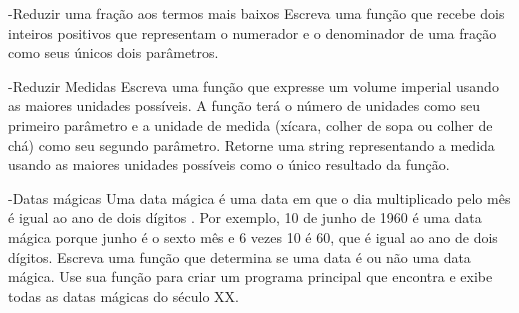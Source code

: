 -Reduzir uma fração aos termos mais baixos Escreva uma função que recebe dois inteiros positivos que representam o numerador e o denominador de uma fração como seus únicos dois parâmetros. 

-Reduzir Medidas Escreva uma função que expresse um volume imperial usando as maiores unidades possíveis. A função terá o número de unidades como seu primeiro parâmetro e a unidade de medida (xícara, colher de sopa ou colher de chá) como seu segundo parâmetro. Retorne uma string representando a medida usando as maiores unidades possíveis como o único resultado da função. 

-Datas mágicas Uma data mágica é uma data em que o dia multiplicado pelo mês é igual ao
ano de dois dígitos . Por exemplo, 10 de junho de 1960 é uma data mágica porque junho é o sexto mês e
6 vezes 10 é 60, que é igual ao ano de dois dígitos. Escreva uma função que determina
se uma data é ou não uma data mágica. Use sua função para criar um programa principal
que encontra e exibe todas as datas mágicas do século XX.


